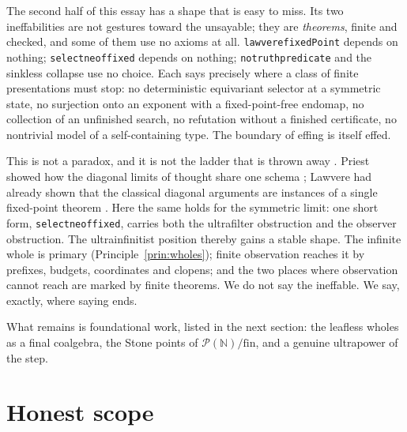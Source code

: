 \documentclass[]{article}
\theoremstyle{definition}
\theoremstyle{remark}
\newcommand{\codeus}{\textunderscore\allowbreak}
\newcommand{\code}[1]{\texttt{\let\_\codeus #1}}
\newcommand{\N}{\mathbb{N}}
\newcommand{\Pfin}{\mathcal{P}(\N)/\mathrm{fin}}
\begin{document}
The second half of this essay has a shape that is easy to miss. Its two ineffabilities are not
gestures toward the unsayable; they are \emph{theorems}, finite and checked, and some of them use no
axioms at all. \code{lawvere\_fixedPoint} depends on nothing; \code{select\_ne\_of\_fixed} depends on
nothing; \code{no\_truth\_predicate} and the sinkless collapse use no choice. Each says precisely
where a class of finite presentations must stop: no deterministic equivariant selector at a symmetric
state, no
surjection onto an exponent with a fixed-point-free endomap, no collection of an unfinished search,
no refutation without a finished certificate, no nontrivial model of a self-containing type. The
boundary of effing is itself effed.

This is not a paradox, and it is not the ladder that is thrown away \cite{Wittgenstein1922}. Priest
showed how the diagonal limits of thought share one schema \cite{Priest1995}; Lawvere had already
shown that the classical diagonal arguments are instances of a single fixed-point theorem
\cite{Lawvere1969, Yanofsky2003}. Here the same holds for the symmetric limit: one short form,
\code{select\_ne\_of\_fixed}, carries both the ultrafilter obstruction and the observer obstruction.
The ultrainfinitist position thereby gains a stable shape. The infinite whole is primary (Principle~\ref{prin:wholes}); finite observation reaches it by
prefixes, budgets, coordinates and clopens; and the two places where observation cannot reach are
marked by finite theorems. We do not say the ineffable. We say, exactly, where saying ends.

What remains is foundational work, listed in the next section: the leafless wholes as a final
coalgebra, the Stone points of $\Pfin$, and a genuine ultrapower of the step.

\section{Honest scope}
\label{sec:scope}
\end{document}
